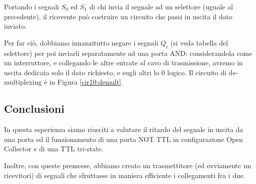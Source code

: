 Portando i segnali $S_0$ ed $S_1$ di chi invia il segnale ad un selettore (uguale al precedente), il ricevente può costruire un circuito che passi in uscita il dato inviato.

Per far ciò, dobbiamo innanzitutto negare i segnali $Q_i$ (si veda tabella del selettore) per poi inviarli separatamente ad una porta AND: considerandola come un interruttore, e collegando le altre entrate al cavo di trasmissione, avremo in uscita dedicata solo il dato richiesto, e sugli altri lo 0 logico.
Il circuito di de-multiplexing è in Figura \ref{cir10:demult}.

\subsection*{Conclusioni}

In questa esperienza siamo riusciti a valutare il ritardo del segnale in uscita da una porta ed il funzionamento di una porta NOT TTL in configurazione Open Collector e di una TTL tri-state.

Inoltre, con queste premesse, abbiamo creato un trasmettitore (ed ovviamente un ricevitori) di segnali che sfruttasse in maniera efficiente i collegamenti fra i due.
